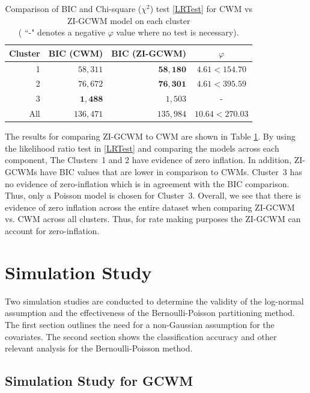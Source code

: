 \documentclass[11pt,letterpaper]{article}
\numberwithin{equation}{section}
\numberwithin{equation}{section}
\numberwithin{equation}{section}
\begin{document}
\begin{table}[!htb]
 \begin{center}
\caption{Comparison of BIC and Chi-square ($\chi^2$) test \eqref{LRTest} for CWM vs ZI-GCWM model on each cluster \\ ( ``-"  denotes a negative $\varphi$ value where no test is necessary).  }
\label{compareResults_models}
\begin{tabular}{r|rrc}
\hline
Cluster & BIC (CWM)  & BIC (ZI-GCWM) &  $\varphi $\\
\hline
 1 & $58,311$ & $\bm{58,180}$ & $ 4.61 < 154.70$ \\
 2 & $76,672$ & $\bm{76,301}$ & $ 4.61 < 395.59 $\\
 3 & $\bm{1,488}$  & $1,503$ &  -  \\ 
\hline 
All & $136,471$ & $135,984$ &  $10.64 < 270.03$
  \\
\hline
\end{tabular}
\end{center}
\end{table}
The results for comparing ZI-GCWM to CWM are shown in Table \ref{compareResults_models}. By using the likelihood ratio test in \eqref{LRTest} and comparing the models across each component, The Clusters~1 and 2 have evidence of zero inflation. In addition, ZI-GCWMs have BIC values that are lower in comparison to CWMs.  Cluster~3 has no evidence of zero-inflation which is in agreement with the BIC comparison. Thus, only a Poisson model is chosen for Cluster~3.  Overall, we see that there is evidence of zero inflation across the entire dataset when comparing ZI-GCWM vs. CWM across all clusters. 
Thus, for rate making purposes the ZI-GCWM can account for zero-inflation.


\section{Simulation Study}\label{sec:sim}

Two simulation studies are conducted to determine the validity of the log-normal assumption and the effectiveness of the Bernoulli-Poisson partitioning method. The first section outlines the need for a non-Gaussian assumption for the covariates. The second section shows the classification accuracy and other relevant analysis for the Bernoulli-Poisson method.


\subsection{Simulation Study for GCWM}
\end{document}
